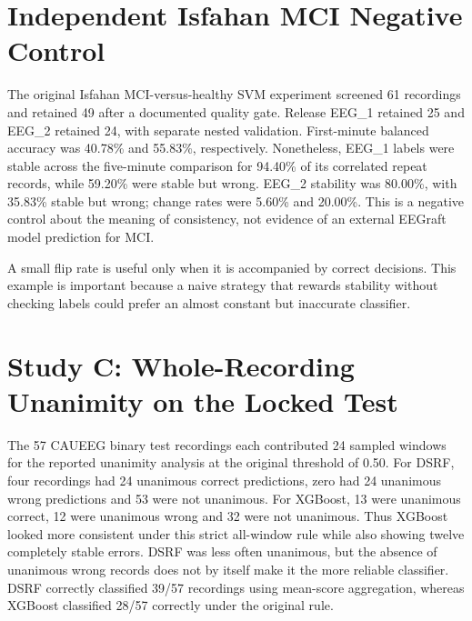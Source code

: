 \section{Independent Isfahan MCI Negative Control}
The original Isfahan MCI-versus-healthy SVM experiment screened 61 recordings and retained 49 after a documented quality gate. Release EEG\_1 retained 25 and EEG\_2 retained 24, with separate nested validation. First-minute balanced accuracy was 40.78\% and 55.83\%, respectively. Nonetheless, EEG\_1 labels were stable across the five-minute comparison for 94.40\% of its correlated repeat records, while 59.20\% were stable but wrong. EEG\_2 stability was 80.00\%, with 35.83\% stable but wrong; change rates were 5.60\% and 20.00\%. This is a negative control about the meaning of consistency, not evidence of an external EEGraft model prediction for MCI.


A small flip rate is useful only when it is accompanied by correct decisions. This example is important because a naive strategy that rewards stability without checking labels could prefer an almost constant but inaccurate classifier.

\section{Study C: Whole-Recording Unanimity on the Locked Test}
The 57 CAUEEG binary test recordings each contributed 24 sampled windows for the reported unanimity analysis at the original threshold of 0.50. For DSRF, four recordings had 24 unanimous correct predictions, zero had 24 unanimous wrong predictions and 53 were not unanimous. For XGBoost, 13 were unanimous correct, 12 were unanimous wrong and 32 were not unanimous. Thus XGBoost looked more consistent under this strict all-window rule while also showing twelve completely stable errors. DSRF was less often unanimous, but the absence of unanimous wrong records does not by itself make it the more reliable classifier. DSRF correctly classified 39/57 recordings using mean-score aggregation, whereas XGBoost classified 28/57 correctly under the original rule.

